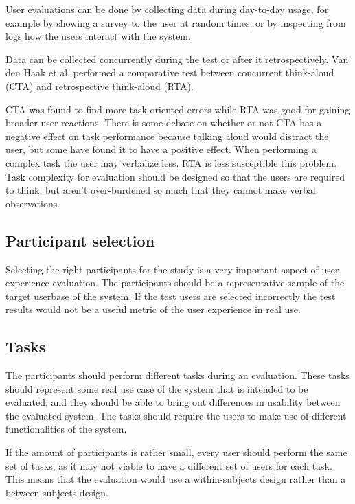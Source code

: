 User evaluations can be done by collecting data during day-to-day usage, for example by showing a survey to the user at random times, or by inspecting from logs how the users interact with the system. \cite{bevanevaluation}

Data can be collected concurrently during the test or after it retrospectively. Van den Haak et al. performed a comparative test between concurrent think-aloud (CTA) and retrospective think-aloud (RTA).

CTA was found to find more task-oriented errors while RTA was good for gaining broader user reactions. There is some debate on whether or not CTA has a negative effect on task performance because talking aloud would distract the user, but some have found it to have a positive effect. When performing a complex task the user may verbalize less. RTA is less susceptible this problem. Task complexity for evaluation should be designed so that the users are required to think, but aren't over-burdened so much that they cannot make verbal observations.
\cite{van2003retrospective}

\subsection{Participant selection}
Selecting the right participants for the study is a very important aspect of user experience evaluation. The participants should be a representative sample of the target userbase of the system. If the test users are selected incorrectly the test results would not be a useful metric of the user experience in real use.

\cite{rubin2008handbook, albert2013measuring}

\subsection{Tasks}
The participants should perform different tasks during an evaluation. These tasks should represent some real use case of the system that is intended to be evaluated, and they should be able to bring out differences in usability between the evaluated system. The tasks should require the users to make use of different functionalities of the system.

If the amount of participants is rather small, every user should perform the same set of tasks, as it may not viable to have a different set of users for each task. This means that the evaluation would use a within-subjects design rather than a between-subjects design. 

